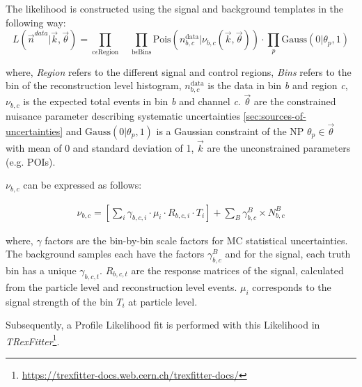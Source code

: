 The likelihood is constructed using the signal and background templates in the following way:
\begin{equation}\label{eq:likelihodd-defn}
	L(\vec{n}^{data} | \vec{k}, \vec{\theta}) = \prod_{\mathrm{c} \epsilon \mathrm{Region}} \quad \prod_{\mathrm{b} \epsilon \mathrm{Bins}} \mathrm{Pois} (n^{\mathrm{data}}_{b,c}|\nu_{b,c}(\vec{k}, \Vec{\theta})) \cdot \prod_{p} \mathrm{Gauss}(0|\theta_{p},1)
\end{equation}

where, \textit{Region} refers to the different signal and control regions, \textit{Bins} refers to the bin of the reconstruction level histogram, $n^{\mathrm{data}}_{b,c}$ is the data in bin \textit{b} and region \textit{c}, $\nu_{b,c}$ is the expected total events in bin \textit{b} and channel \textit{c}. $\Vec{\theta}$ are the constrained nuisance parameter describing systematic uncertainties \cref{sec:sources-of-uncertainties} and $\mathrm{Gauss}(0|\theta_p,1)$ is a Gaussian constraint of the NP $\theta_p \in \vec{\theta}$ with mean of 0 and standard deviation of 1, $\vec{k}$ are the unconstrained parameters (e.g. POIs).

$\nu_{b,c}$ can be expressed as follows:

\begin{align}\label{eq:likelihodd-defn-1}
    \nu_{b,c} = \left[\sum_i \gamma_{b,c,i} \cdot \mu_{i} \cdot R_{b,c,i} \cdot T_{i}\right] + \sum_{B} \gamma_{b,c}^{B} \times N_{b,c}^{B} 
\end{align}

where, $\gamma$ factors are the bin-by-bin scale factors for MC statistical uncertainties. The background samples each have the factors $\gamma_{b,c}^{B}$ and for the signal, each truth bin has a unique $\gamma_{b,c,t}$. $R_{b,c,t}$ are the response matrices of the signal, calculated from the particle level and reconstruction level events. $\mu_{i}$ corresponds to the signal strength of the bin $T_{i}$ at particle level.

Subsequently, a Profile Likelihood fit is performed with this Likelihood in \emph{TRexFitter}\footnote{\url{https://trexfitter-docs.web.cern.ch/trexfitter-docs/}}.


